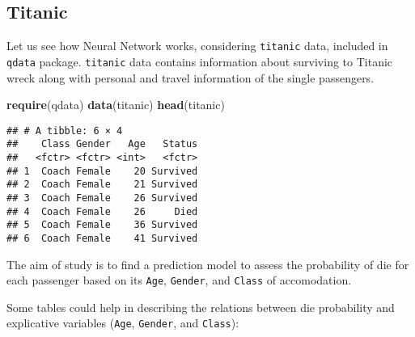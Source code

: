 \documentclass[]{book}
\newenvironment{Shaded}{\begin{snugshade}}{\end{snugshade}}
\newcommand{\KeywordTok}[1]{\textcolor[rgb]{0.13,0.29,0.53}{\textbf{{#1}}}}
\newcommand{\DataTypeTok}[1]{\textcolor[rgb]{0.13,0.29,0.53}{{#1}}}
\newcommand{\DecValTok}[1]{\textcolor[rgb]{0.00,0.00,0.81}{{#1}}}
\newcommand{\StringTok}[1]{\textcolor[rgb]{0.31,0.60,0.02}{{#1}}}
\newcommand{\CommentTok}[1]{\textcolor[rgb]{0.56,0.35,0.01}{\textit{{#1}}}}
\newcommand{\NormalTok}[1]{{#1}}
\begin{document}
\subsection{Titanic}\label{titanic}

Let us see how Neural Network works, considering \texttt{titanic} data,
included in \texttt{qdata} package. \texttt{titanic} data contains
information about surviving to Titanic wreck along with personal and
travel information of the single passengers.

\begin{Shaded}
\begin{Highlighting}[]
\KeywordTok{require}\NormalTok{(qdata)}
\KeywordTok{data}\NormalTok{(titanic)}
\KeywordTok{head}\NormalTok{(titanic)}
\end{Highlighting}
\end{Shaded}

\begin{verbatim}
## # A tibble: 6 × 4
##    Class Gender   Age   Status
##   <fctr> <fctr> <int>   <fctr>
## 1  Coach Female    20 Survived
## 2  Coach Female    21 Survived
## 3  Coach Female    26 Survived
## 4  Coach Female    26     Died
## 5  Coach Female    36 Survived
## 6  Coach Female    41 Survived
\end{verbatim}

The aim of study is to find a prediction model to assess the probability
of die for each passenger based on its \texttt{Age}, \texttt{Gender},
and \texttt{Class} of accomodation.

Some tables could help in describing the relations between die
probability and explicative variables (\texttt{Age}, \texttt{Gender},
and \texttt{Class}):

\begin{Shaded}
\end{Shaded}
\end{document}

